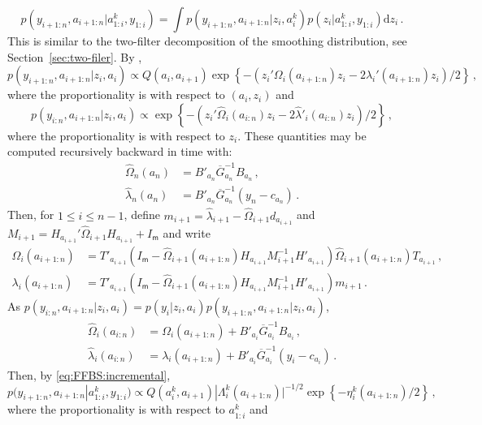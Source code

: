 \documentclass[nolayout]{article}
\theoremstyle{plain}
\theoremstyle{definition}
\newcommand{\1}{\mathbbm{1}}
\def\rmd{\mathrm{d}}
\def\dimz{\mathsf{m}}
\def\barG{\overline{G}}
\def\eqsp{\,}
\begin{document}
\begin{equation}
\label{eq:FFBS:incremental}
p(y_{i+1:n},a_{i+1:n}|a^k_{1:i},y_{1:i}) = \int p(y_{i+1:n},a_{i+1:n}|z_i,a^k_{i})p(z_{i}|a^k_{1:i},y_{1:i})\rmd z_i\eqsp.
\end{equation}
This is similar to the two-filter decomposition of the smoothing distribution, see Section~\ref{sec:two-filer}. By  \cite{lindsten:bunch:sarkka:schon:godsill:2015},
\[
p(y_{i+1:n},a_{i+1:n}|z_i,a_{i}) \propto Q(a_i,a_{i+1}) \exp\left\{-(z_i'\Omega_i(a_{i+1:n})z_i-2\lambda_i'(a_{i+1:n})z_i)/2\right\}\eqsp,
\]
where the proportionality is with respect to $(a_i,z_i)$ and
\[
p(y_{i:n},a_{i+1:n}|z_i,a_{i}) \propto \exp\left\{-(z_i'\widehat{\Omega}_i(a_{i:n})z_i-2\widehat{\lambda}'_i(a_{i:n})z_i)/2\right\}\eqsp,
\]
where the proportionality is with respect to $z_i$. These quantities may be computed recursively backward in time with:
\begin{align*}
\widehat{\Omega}_n(a_n) &= B'_{a_n}\barG^{-1}_{a_n}B_{a_n}\eqsp,\\
\widehat{\lambda}_n(a_n) &=B'_{a_n}\barG^{-1}_{a_n}(y_n-c_{a_n})\eqsp.
\end{align*}
Then, for $1\le i\le n-1$, define $m_{i+1} = \widehat{\lambda}_{i+1} - \widehat{\Omega}_{i+1}d_{a_{i+1}}$ and $M_{i+1} = H_{a_{i+1}}'\widehat{\Omega}_{i+1}H_{a_{i+1}} + I_{\dimz}$ and write
\begin{align*}
\Omega_i(a_{i+1:n}) &= T'_{a_{i+1}}(I_{\dimz}-\widehat{\Omega}_{i+1}(a_{i+1:n})H_{a_{i+1}}M^{-1}_{i+1}H'_{a_{i+1}})\widehat{\Omega}_{i+1}(a_{i+1:n})T_{a_{i+1}}\eqsp,\\
\lambda_i(a_{i+1:n}) &=T'_{a_{i+1}}(I_{\dimz}-\widehat{\Omega}_{i+1}(a_{i+1:n})H_{a_{i+1}}M^{-1}_{i+1}H'_{a_{i+1}})m_{i+1}\eqsp.
\end{align*}
As $p(y_{i:n},a_{i+1:n}|z_i,a_{i}) = p(y_{i}|z_i,a_{i})p(y_{i+1:n},a_{i+1:n}|z_i,a_{i})$,
\begin{align*}
\widehat{\Omega}_i(a_{i:n}) &= \Omega_i(a_{i+1:n})+ B'_{a_i}\barG^{-1}_{a_i}B_{a_i}\eqsp,\\
\widehat{\lambda}_i(a_{i:n}) & = \lambda_i(a_{i+1:n}) + B'_{a_i}\barG^{-1}_{a_i}(y_i-c_{a_i})\eqsp.
\end{align*}
Then, by \eqref{eq:FFBS:incremental},
\begin{equation}
\label{eq:post:obs}
p(y_{i+1:n},a_{i+1:n}|a^k_{1:i},y_{1:i})\propto Q(a_i^k,a_{i+1})|\Lambda^k_i(a_{i+1:n})|^{-1/2}\exp\left\{-\eta^k_i(a_{i+1:n})/2\right\}\eqsp,
\end{equation}
where the proportionality is with respect to $a^k_{1:i}$ and
\end{document}
